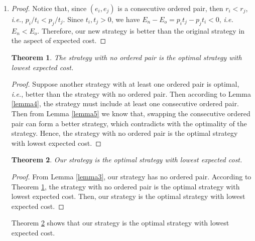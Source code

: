 \documentclass{oxmathproblems}
\makeatletter
\newtheorem{theorem}{Theorem}
\theoremstyle{definition}
\renewenvironment{solution}[1][Solution] {\par\pushQED{\qed}\normalfont\topsep6\p@\@plus6\p@\relax\trivlist\item[\hskip\labelsep\bfseries#1\@addpunct{.}]\ignorespaces}{\popQED\endtrivlist\@endpefalse} \makeatother
\makeatother
\begin{document}
\begin{enumerate}
\begin{solution}
\begin{proof}
		Notice that, since $(e_i, e_j)$ is a consecutive ordered pair, then $r_i < r_j$, \textit{i.e.}, $p_i/t_i < p_j/t_j$. Since $t_i, t_j > 0$, we have $E_n - E_o = p_it_j - p_jt_i < 0$, \textit{i.e.} $E_n < E_o$. Therefore, our new strategy is better than the original strategy in the aspect of expected cost. 
	\end{proof}
	\begin{theorem}\label{th6}
	The strategy with no ordered pair is the optimal strategy with lowest expected cost.
	\end{theorem}
	\begin{proof}
		Suppose another strategy with at least one ordered pair is optimal, \textit{i.e.}, better than the strategy with no ordered pair. Then according to Lemma \ref{lemma4}, the strategy must include at least one consecutive ordered pair. Then from Lemma \ref{lemma5} we know that, swapping the consecutive ordered pair can form a better strategy, which contradicts with the optimality of the strategy. Hence, the strategy with no ordered pair is the optimal strategy with lowest expected cost.
	\end{proof}
	\begin{theorem}\label{th7}
		Our strategy is the optimal strategy with lowest expected cost.
	\end{theorem}
	\begin{proof}
		From Lemma \ref{lemma3}, our strategy has no ordered pair. According to Theorem \ref{th6}, the strategy with no ordered pair is the optimal strategy with lowest expected cost. Then, our strategy is the optimal strategy with lowest expected cost.
	\end{proof}

	Theorem \ref{th7} shows that our strategy is the optimal strategy with lowest expected cost.
\end{solution}
\clearpage


\end{enumerate}
\end{document}
